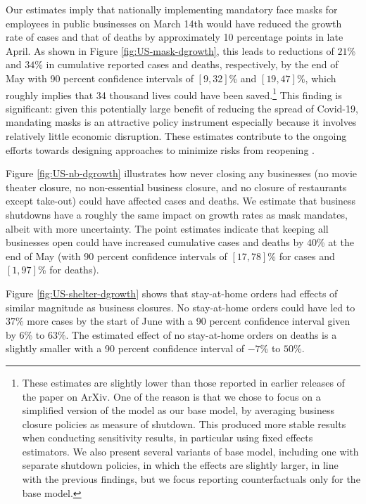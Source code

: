 \documentclass[11pt,reqno,letter]{amsart}
\theoremstyle{definition}
\begin{document}
Our estimates imply that nationally implementing mandatory face masks
for employees in public businesses on March 14th would have reduced the
growth rate of cases and that of deaths by approximately 10 percentage
points in late April. As shown in Figure \ref{fig:US-mask-dgrowth},
this leads to reductions of $21$\% and $34$\% in cumulative reported
cases and deaths, respectively, by the end of May with 90 percent
confidence intervals of $[9,32]$\% and $[19,47]$\%, which roughly
implies that 34 thousand lives could have been saved.\footnote{These estimates
are slightly lower than those reported in earlier releases of the paper on ArXiv.
One of the reason is that we chose to focus on a simplified version of the model 
as our base model, by
averaging business
closure policies as measure of shutdown. This produced more stable results when
conducting sensitivity results, in particular using fixed effects estimators.  
We also present several variants of base model, including
one with separate shutdown policies, in which the effects are slightly larger, in line
with the previous findings, but we focus reporting counterfactuals only 
for the base model. } This finding is
significant: given this potentially large benefit of reducing the
spread of Covid-19, mandating masks is an attractive policy instrument
especially because it involves relatively little economic
disruption. These estimates contribute to the ongoing efforts towards
designing approaches to minimize risks from reopening
\citep{stock2020b}.


Figure \ref{fig:US-nb-dgrowth} illustrates how never closing any
businesses (no movie theater closure, no non-essential business
closure, and no closure of restaurants except take-out) could have
affected cases and deaths.  We estimate that business shutdowns have a
roughly the same impact on growth rates as mask mandates, albeit with
more uncertainty. The point estimates indicate that keeping all
businesses open could have increased cumulative cases and deaths by
$40\%$ at the end of May (with 90 percent confidence intervals of
$[17,78]$\% for cases and $[1,97]$\% for deaths).

Figure \ref{fig:US-shelter-dgrowth} shows that stay-at-home orders had
effects of similar magnitude as business closures.  No stay-at-home
orders could have led to $37$\% more cases by the start of June with a
90 percent confidence interval given by $6$\% to $63$\%. The estimated
effect of no stay-at-home orders on deaths is a slightly smaller with
a 90 percent confidence interval of $-7$\% to $50$\%.  
\end{document}
